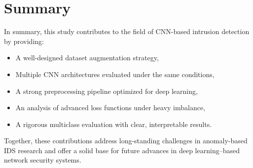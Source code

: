 \section{Summary}
In summary, this study contributes to the field of CNN-based intrusion detection by providing:
\begin{itemize}
\item	A well-designed dataset augmentation strategy,
\item	Multiple CNN architectures evaluated under the same conditions,
\item	A strong preprocessing pipeline optimized for deep learning,
\item	An analysis of advanced loss functions under heavy imbalance,
\item	A rigorous multiclass evaluation with clear, interpretable results.
\end{itemize}
Together, these contributions address long-standing challenges in anomaly-based IDS research and offer a solid base for future advances in deep learning–based network security systems.
